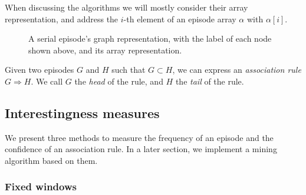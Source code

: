 When discussing the algorithms we will mostly consider their array representation, and address the $ i $-th element of an episode array $ \alpha $ with $ \alpha [i] $.

\begin{figure}
\centering


\caption{A serial episode's graph representation, with the label of each node shown above, and its array representation.}
\label{fig:serial-representation}
\end{figure}

\begin{definition}
Given two episodes $ G $ and $ H $ such that $ G \subset H $, we can express an \emph{association rule} $ G \Rightarrow H $. We call $ G $ the \emph{head} of the rule, and $ H $ the \emph{tail} of the rule.
\end{definition}

\subsection{Interestingness measures}

We present three methods to measure the frequency of an episode and the confidence of an association rule. In a later section, we implement a mining algorithm based on them.

\subsubsection{Fixed windows}

